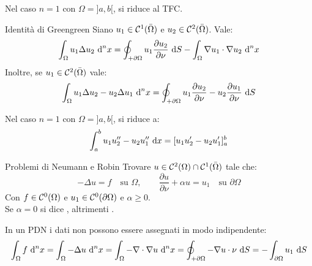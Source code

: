 \documentclass{article}
\begin{document}
\begin{remark}{}{}
    Nel caso $n=1$ con $\Omega =]a,b[$, si riduce al TFC.
\end{remark}

\begin{theorem}{Identità di Green}{green}
    Siano $u_1 \in \mathcal{C}^1(\bar{\Omega})$ e $u_2 \in \mathcal{C}^2(\bar{\Omega})$. Vale:
    \[\int_{\Omega} u_1\Delta u_2 \text{ d}^n x = \oint_{+\partial\Omega} u_1 \frac{\partial u_2}{\partial \nu}\text{ d} S - \int_\Omega \nabla u_1 \cdot \nabla u_2 \text{ d}^n x \]
    Inoltre, se $u_1 \in \mathcal{C}^2(\bar{\Omega})$ vale:
    \[\int_\Omega u_1\Delta u_2 - u_2 \Delta u_1 \text{ d}^n x = \oint_{+\partial\Omega} u_1 \frac{\partial u_2}{\partial \nu} - u_2 \frac{\partial u_1}{\partial \nu} \text{ d} S\]
\end{theorem}

\begin{remark}{}{}
    Nel caso $n=1$ con $\Omega =]a,b[$, si riduce a:
    \[\int_a^b u_1 u_2'' - u_2 u_1'' \text{ d} x = [u_1u_2' - u_2u_1']_a^b\]
\end{remark}

\begin{definition}{Problemi di Neumann e Robin}{}
    Trovare $u \in \mathcal{C}^2(\Omega)\cap\mathcal{C}^1(\bar{\Omega})$ tale che:
    \[-\Delta u = f \quad \text{su }\Omega, \qquad \frac{\partial u}{\partial\nu} + \alpha u = u_1 \quad\text{su }\partial\Omega\]
    Con $f \in \mathcal{C}^0(\Omega)$ e $u_1 \in \mathcal{C}^0(\partial\Omega)$ e $\alpha \ge 0$.\\
    Se $\alpha = 0$ si dice , altrimenti .
\end{definition}

\begin{remark}{}{}
    In un PDN i dati non possono essere assegnati in modo indipendente:
    \[\int_\Omega f\text{ d}^n x = \int_\Omega -\Delta u \text{ d}^n x = \int_\Omega -\nabla \cdot \nabla u \text{ d}^n x = \oint_{+\partial \Omega} - \nabla u \cdot \nu \text{ d} S = -\int_{\partial \Omega} u_1 \text{ d} S\]
\end{remark}
\end{document}
